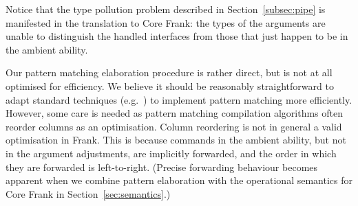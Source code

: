 \documentclass[12pt]{article}
\begin{document}
Notice that the type pollution problem described in
Section~\ref{subsec:pipe} is manifested in the translation to Core
Frank: the types of the arguments are unable to distinguish the handled
interfaces from those that just happen to be in the ambient ability.

Our pattern matching elaboration procedure is rather direct, but is
not at all optimised for efficiency. We believe it should be
reasonably straightforward to adapt standard techniques
(e.g.~\cite{Maranget08}) to implement pattern matching more
efficiently.
%
However, some care is needed as pattern matching compilation
algorithms often reorder columns as an optimisation. Column reordering
is not in general a valid optimisation in Frank. This is because
commands in the ambient ability, but not in the argument adjustments,
are implicitly forwarded, and the order in which they are forwarded is
left-to-right.
%
(Precise forwarding behaviour becomes apparent when we
combine pattern elaboration with the operational semantics for Core
Frank in Section~\ref{sec:semantics}.)

\end{document}
